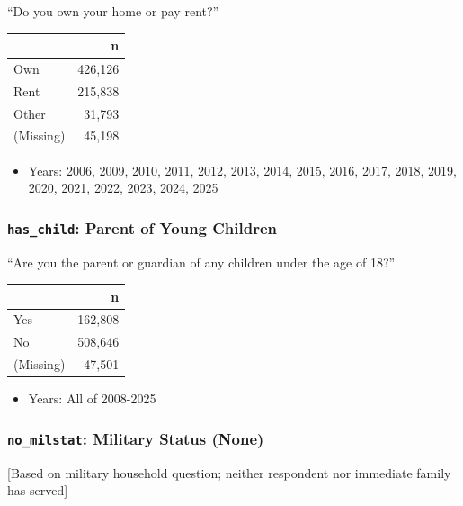 \documentclass[10pt,article,oneside]{memoir}
\begin{document}
``Do you own your home or pay rent?''

\begin{table}[H]
\centering
\begin{tabular}[t]{lr}
\toprule
 & n\\
\midrule
Own & 426,126\\
Rent & 215,838\\
Other & 31,793\\
(Missing) & 45,198\\
\bottomrule
\end{tabular}
\end{table}

\begin{itemize}
\tightlist
\item
  Years: 2006, 2009, 2010, 2011, 2012, 2013, 2014, 2015, 2016, 2017,
  2018, 2019, 2020, 2021, 2022, 2023, 2024, 2025
\end{itemize}

\subsubsection{\texorpdfstring{\texttt{has\_child}: Parent of Young
Children}{has\_child: Parent of Young Children}}\label{has_child-parent-of-young-children}

``Are you the parent or guardian of any children under the age of 18?''

\begin{table}[H]
\centering
\begin{tabular}[t]{lr}
\toprule
 & n\\
\midrule
Yes & 162,808\\
No & 508,646\\
(Missing) & 47,501\\
\bottomrule
\end{tabular}
\end{table}

\begin{itemize}
\tightlist
\item
  Years: All of 2008-2025
\end{itemize}

\subsubsection{\texorpdfstring{\texttt{no\_milstat}: Military Status
(None)}{no\_milstat: Military Status (None)}}\label{no_milstat-military-status-none}

{[}Based on military household question; neither respondent nor
immediate family has served{]}
\end{document}
